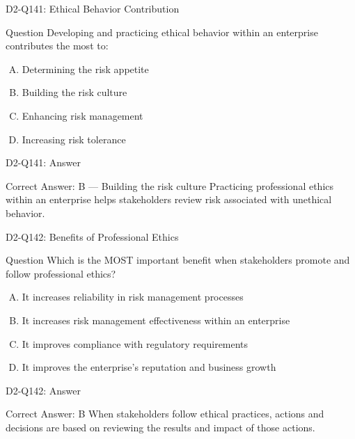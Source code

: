 \documentclass{beamer}
\begin{document}
	\begin{frame}{D2-Q141: Ethical Behavior Contribution}
		\begin{block}{Question}
			Developing and practicing ethical behavior within an enterprise contributes the most to:
		\end{block}
		\begin{enumerate}[(A)]
			\item Determining the risk appetite
			\item Building the risk culture
			\item Enhancing risk management
			\item Increasing risk tolerance
		\end{enumerate}
	\end{frame}
	\begin{frame}{D2-Q141: Answer}
		\begin{block}{Correct Answer: B --- Building the risk culture}
			Practicing professional ethics within an enterprise helps stakeholders review risk associated with unethical behavior.
		\end{block}
	\end{frame}
	
	\begin{frame}{D2-Q142: Benefits of Professional Ethics}
		\begin{block}{Question}
			Which is the MOST important benefit when stakeholders promote and follow professional ethics?
		\end{block}
		\begin{enumerate}[(A)]
			\item It increases reliability in risk management processes
			\item It increases risk management effectiveness within an enterprise
			\item It improves compliance with regulatory requirements
			\item It improves the enterprise's reputation and business growth
		\end{enumerate}
	\end{frame}
	\begin{frame}{D2-Q142: Answer}
		\begin{block}{Correct Answer: B}
			When stakeholders follow ethical practices, actions and decisions are based on reviewing the results and impact of those actions.
		\end{block}
	\end{frame}
	
\end{document}
